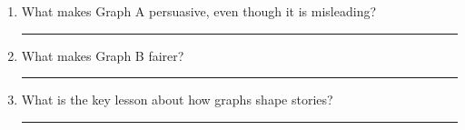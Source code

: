 \documentclass[letterpaper,10pt]{article}
\begin{document}
\begin{enumerate}[itemsep=1em]
  \item What makes Graph A persuasive, even though it is misleading?

  \vspace{1em}
  \rule{14cm}{0.4pt}

  \item What makes Graph B fairer?

  \vspace{1em}
  \rule{14cm}{0.4pt}

  \item What is the key lesson about how graphs shape stories?

  \vspace{1em}
  \rule{14cm}{0.4pt}
\end{enumerate}
\end{document}
